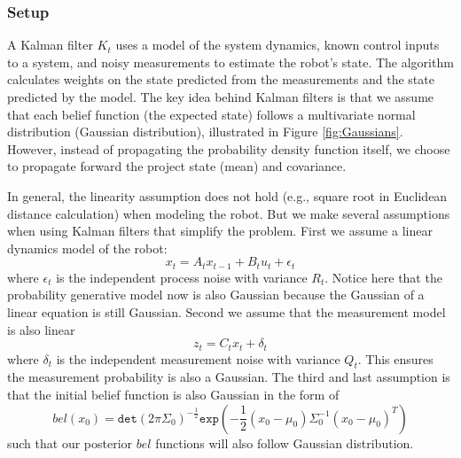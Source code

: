 \documentclass[twoside]{article}
\begin{document}
\subsubsection{Setup}
A Kalman filter $K_t$ uses a model of the system dynamics, known control inputs to a system, and noisy measurements to estimate the robot's state. The algorithm calculates weights on the state predicted from the measurements and the state predicted by the model. The key idea behind Kalman filters is that we assume that each belief function (the expected state) follows a multivariate normal distribution (Gaussian distribution), illustrated in Figure \ref{fig:Gaussians}. However, instead of propagating the probability density function itself, we choose to propagate forward the project state (mean) and covariance.

\par
In general, the linearity assumption does not hold (e.g., square root in Euclidean distance calculation) when modeling the robot. But we make several assumptions when using Kalman filters that simplify the problem.
First we assume a linear dynamics model of the robot:
\begin{equation}
x_t = A_t x_{t-1} + B_t u_t + \epsilon_{t}
\end{equation}
where $\epsilon_{t}$ is the independent process noise with variance $R_t$. Notice here that the probability generative model now is also Gaussian because the Gaussian of a linear equation is still Gaussian. Second we assume that the measurement model is also linear
\begin{equation}
z_t = C_t x_t + \delta_t
\end{equation}
where $\delta_t$ is the independent measurement noise with variance $Q_t$. This ensures the measurement probability is also a Gaussian. The third and last assumption is that the initial belief function is also Gaussian in the form of \begin{equation}
bel(x_0) = \mathtt{det}(2\pi\Sigma_0)^{-\frac{1}{2}}\mathtt{exp}(-\frac{1}{2}(x_0-\mu_0)\Sigma_0^{-1}(x_0-\mu_0)^{T})
\end{equation} 
such that our posterior $bel$ functions will also follow Gaussian distribution.
\end{document}
